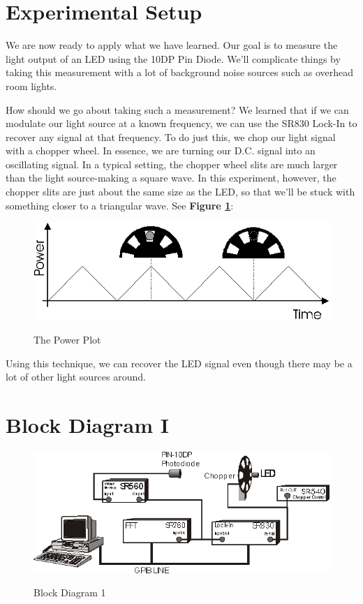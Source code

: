 \documentclass{../lab}
\begin{document}
\section{Experimental Setup}

We are now ready to apply what we have learned. Our goal is to measure the light output of an LED using the 10DP Pin Diode. We'll complicate things by taking this measurement with a lot of background noise sources such as overhead room lights.

How should we go about taking such a measurement? We learned that if we can modulate our light source at a known frequency, we can use the SR830 Lock-In to recover any signal at that frequency. To do just this, we chop our light signal with a chopper wheel. In essence, we are turning our D.C. signal into an oscillating signal. In a typical setting, the chopper wheel slits are much larger than the light source-making a square wave. In this experiment, however, the chopper slits are just about the same size as the LED, so that we'll be stuck with something closer to a triangular wave. See \textbf{Figure \ref{fig:PowerVsTime}}:

\begin{figure}[h]
    \centering
    \href{http://experimentationlab.berkeley.edu/sites/default/files/images/LLSimage044.gif}{\includegraphics[width=0.5\linewidth]{images/LLSimage044.png}}
    \caption{The Power Plot}
    \label{fig:PowerVsTime}
\end{figure}

\noindent Using this technique, we can recover the LED signal even though there may be a lot of other light sources around.

\section{Block Diagram I}

\begin{figure}[h]
    \centering
    \href{http://experimentationlab.berkeley.edu/sites/default/files/images/LLSimage045.gif}{\includegraphics[width=0.5\linewidth]{images/LLSimage045.png}}
    \caption{Block Diagram 1}
    \label{fig:BlockDiagramI}
\end{figure}
\end{document}
